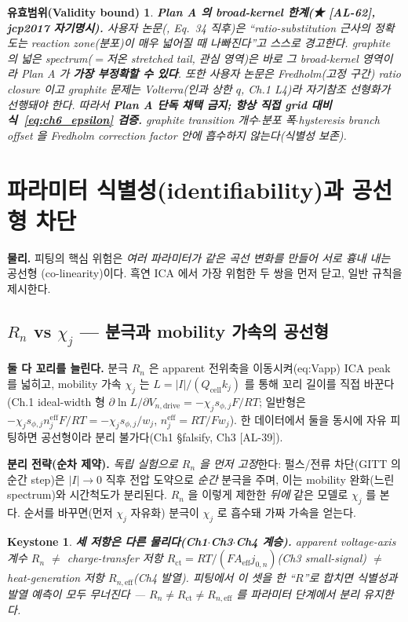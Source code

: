 \documentclass[11pt,a4paper]{article}
\newtheorem*{boundbox}{유효범위(Validity bound)}
\newtheorem*{keybox}{Keystone}
\newcommand{\eff}{\mathrm{eff}}
\newcommand{\drive}{\mathrm{drive}}
\newcommand{\cell}{\mathrm{cell}}
\newcommand{\ct}{\mathrm{ct}}
\newcommand{\AL}[1]{\textsf{[AL-#1]}}
\begin{document}
\begin{boundbox}
\textbf{Plan A 의 broad-kernel 한계(★ \AL{62}, jcp2017 자기명시).} 사용자 논문(\cite{jcp2017}, Eq.~34 직후)은
``ratio-substitution 근사의 정확도는 reaction zone(분포)이 매우 넓어질 때 나빠진다''고 \emph{스스로 경고}한다.
graphite 의 넓은 spectrum($=$저온 stretched tail, \emph{관심 영역})은 바로 그 broad-kernel 영역이라 Plan A 가
\textbf{가장 부정확할 수 있다}. 또한 사용자 논문은 \emph{Fredholm}(고정 구간) ratio closure 이고 graphite 문제는
\emph{Volterra}(인과 상한 $q$, Ch.1 L4)라 자기참조 선형화가 선행돼야 한다. 따라서 \textbf{Plan A 단독 채택 금지;
항상 직접 grid 대비 식~\eqref{eq:ch6_epsilon} 검증.} graphite transition 개수$\cdot$분포 폭$\cdot$hysteresis branch
offset 을 Fredholm correction factor 안에 흡수하지 않는다(식별성 보존).
\end{boundbox}

\section{파라미터 식별성(identifiability)과 공선형 차단}\label{sec:ch6_identif}
\textbf{물리.} 피팅의 핵심 위험은 \emph{여러 파라미터가 같은 곡선 변화를 만들어 서로 흉내 내는} 공선형
(co-linearity)이다. 흑연 ICA 에서 가장 위험한 두 쌍을 먼저 닫고, 일반 규칙을 제시한다.

\subsection{$R_n$ vs $\chi_j$ — 분극과 mobility 가속의 공선형}\label{sec:ch6_RnChi}
\textbf{둘 다 꼬리를 늘린다.} 분극 $R_n$ 은 apparent 전위축을 이동시켜(eq:Vapp) ICA peak 를 넓히고, mobility 가속
$\chi_j$ 는 $L=|I|/(Q_\cell k_j)$ 를 통해 꼬리 길이를 직접 바꾼다(Ch.1 ideal-width 형
$\partial\ln L/\partial V_{n,\drive}=-\chi_j s_{\phi,j}F/RT$; 일반형은 $-\chi_j s_{\phi,j}n_j^{\eff}F/RT
=-\chi_j s_{\phi,j}/w_j$, $n_j^{\eff}=RT/Fw_j$). 한 데이터에서 둘을 동시에 자유 피팅하면 공선형이라 분리 불가다(Ch1 \S falsify, Ch3
\AL{39}).

\textbf{분리 전략(순차 제약).} \emph{독립 실험으로 $R_n$ 을 먼저 고정}한다: 펄스/전류 차단(GITT 의 순간 step)은
$|I|\to0$ 직후 전압 도약으로 \emph{순간} 분극을 주며, 이는 mobility 완화(느린 spectrum)와 시간척도가 분리된다.
$R_n$ 을 이렇게 제한한 \emph{뒤에} 같은 모델로 $\chi_j$ 를 본다. 순서를 바꾸면(먼저 $\chi_j$ 자유화) 분극이
$\chi_j$ 로 흡수돼 가짜 가속을 얻는다.
\begin{keybox}
\textbf{세 저항은 다른 물리다(Ch1$\cdot$Ch3$\cdot$Ch4 계승).} apparent voltage-axis 계수 $R_n$ $\ne$ charge-transfer
저항 $R_\ct=RT/(FA_\eff j_{0,n})$(Ch3 small-signal) $\ne$ heat-generation 저항 $R_{n,\eff}$(Ch4 발열). 피팅에서
이 셋을 한 ``$R$''로 합치면 식별성과 발열 예측이 모두 무너진다 — \textbf{$R_n\ne R_\ct\ne R_{n,\eff}$} 를
파라미터 단계에서 분리 유지한다.
\end{keybox}
\end{document}
